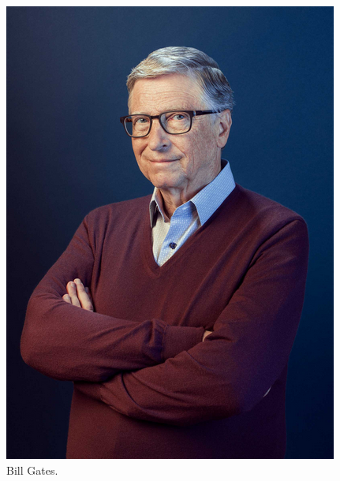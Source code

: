 \documentclass[11pt,twoside]{book}
\begin{document}
\begin{figure}[htb]
  \centering
  \includegraphics[width=0.5\linewidth]{bibliografias/gates.PNG}
  \caption{Bill Gates.}
  \label{fig:etiqueta}
\end{figure}
\newpage
\end{document}
